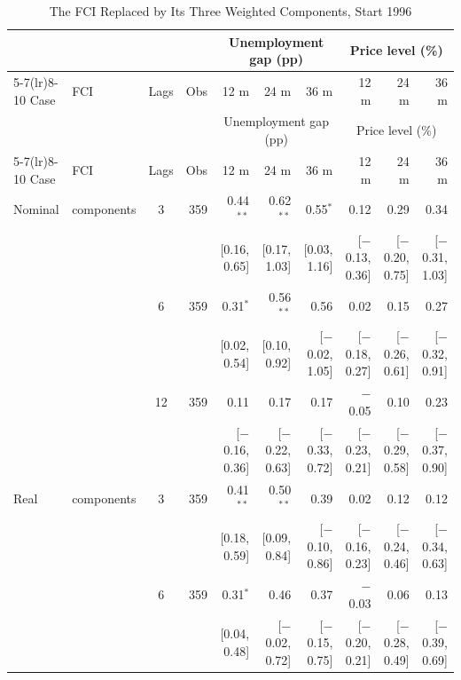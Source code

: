 \begingroup\scriptsize\setlength{\tabcolsep}{0.9pt}
\begin{longtable}{llcrrrrrrr}
\caption{The FCI Replaced by Its Three Weighted Components, Start 1996}\label{tab:appR4}\\
\toprule
 & & & & \multicolumn{3}{c}{Unemployment gap (pp)} & \multicolumn{3}{c}{Price level (\%)}\\ \cmidrule(lr){5-7}\cmidrule(lr){8-10}
Case & FCI & Lags & Obs & 12 m & 24 m & 36 m & 12 m & 24 m & 36 m\\
\midrule\endfirsthead
\toprule
 & & & & \multicolumn{3}{c}{Unemployment gap (pp)} & \multicolumn{3}{c}{Price level (\%)}\\ \cmidrule(lr){5-7}\cmidrule(lr){8-10}
Case & FCI & Lags & Obs & 12 m & 24 m & 36 m & 12 m & 24 m & 36 m\\
\midrule\endhead
\bottomrule\endfoot
Nominal & components & 3 & 359 & 0.44$^{**}$ & 0.62$^{**}$ & 0.55$^{*}$ & 0.12 & 0.29 & 0.34\\
 & & & & {\scriptsize [0.16, 0.65]} & {\scriptsize [0.17, 1.03]} & {\scriptsize [0.03, 1.16]} & {\scriptsize [$-$0.13, 0.36]} & {\scriptsize [$-$0.20, 0.75]} & {\scriptsize [$-$0.31, 1.03]}\\
 &  & 6 & 359 & 0.31$^{*}$ & 0.56$^{**}$ & 0.56 & 0.02 & 0.15 & 0.27\\
 & & & & {\scriptsize [0.02, 0.54]} & {\scriptsize [0.10, 0.92]} & {\scriptsize [$-$0.02, 1.05]} & {\scriptsize [$-$0.18, 0.27]} & {\scriptsize [$-$0.26, 0.61]} & {\scriptsize [$-$0.32, 0.91]}\\
 &  & 12 & 359 & 0.11 & 0.17 & 0.17 & $-$0.05 & 0.10 & 0.23\\
 & & & & {\scriptsize [$-$0.16, 0.36]} & {\scriptsize [$-$0.22, 0.63]} & {\scriptsize [$-$0.33, 0.72]} & {\scriptsize [$-$0.23, 0.21]} & {\scriptsize [$-$0.29, 0.58]} & {\scriptsize [$-$0.37, 0.90]}\\
\addlinespace
Real & components & 3 & 359 & 0.41$^{**}$ & 0.50$^{**}$ & 0.39 & 0.02 & 0.12 & 0.12\\
 & & & & {\scriptsize [0.18, 0.59]} & {\scriptsize [0.09, 0.84]} & {\scriptsize [$-$0.10, 0.86]} & {\scriptsize [$-$0.16, 0.23]} & {\scriptsize [$-$0.24, 0.46]} & {\scriptsize [$-$0.34, 0.63]}\\
 &  & 6 & 359 & 0.31$^{*}$ & 0.46 & 0.37 & $-$0.03 & 0.06 & 0.13\\
 & & & & {\scriptsize [0.04, 0.48]} & {\scriptsize [$-$0.02, 0.72]} & {\scriptsize [$-$0.15, 0.75]} & {\scriptsize [$-$0.20, 0.21]} & {\scriptsize [$-$0.28, 0.49]} & {\scriptsize [$-$0.39, 0.69]}\\

\end{longtable}
